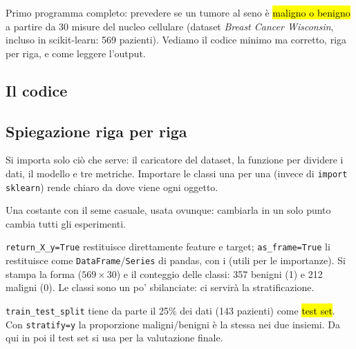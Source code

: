 
\begin{inbreve}
Primo programma completo: prevedere se un tumore al seno è \hl{maligno o benigno} a partire da 30 misure del nucleo cellulare (dataset \emph{Breast Cancer Wisconsin}, incluso in scikit-learn: 569 pazienti). Vediamo il codice minimo ma corretto, riga per riga, e come leggere l'output.
\end{inbreve}

\subsection{Il codice}


\subsection{Spiegazione riga per riga}

\begin{tecnica}
Si importa solo ciò che serve: il caricatore del dataset, la funzione per dividere i dati, il modello e tre metriche. Importare le classi una per una (invece di \texttt{import sklearn}) rende chiaro da dove viene ogni oggetto.

 Una costante con il seme casuale, usata ovunque: cambiarla in un solo punto cambia tutti gli esperimenti.
\end{tecnica}

\begin{tecnica}
\texttt{return\_X\_y=True} restituisce direttamente feature e target; \texttt{as\_frame=True} li restituisce come \texttt{DataFrame}/\texttt{Series} di pandas, con i  (utili per le importanze). Si stampa la forma ($569\times30$) e il conteggio delle classi: 357 benigni (1) e 212 maligni (0). Le classi sono un po' sbilanciate: ci servirà la stratificazione.
\end{tecnica}

\begin{tecnica}
\texttt{train\_test\_split} tiene da parte il 25\% dei dati (143 pazienti) come \hl{test set}. Con \texttt{stratify=y} la proporzione maligni/benigni è la stessa nei due insiemi. Da qui in poi il test set si usa  per la valutazione finale.
\end{tecnica}

